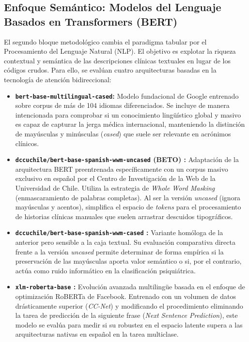 \documentclass[12pt,a4paper,onecolumn,oneside]{report}
\begin{document}
\subsection{Enfoque Semántico: Modelos del Lenguaje Basados en Transformers (BERT)}

El segundo bloque metodológico cambia el paradigma tabular por el Procesamiento del Lenguaje Natural (NLP). El objetivo es explotar la riqueza contextual y semántica de las descripciones clínicas textuales en lugar de los códigos crudos. Para ello, se evalúan cuatro arquitecturas basadas en la tecnología de atención bidireccional:

\begin{itemize}
\item \textbf{\texttt{bert-base-multilingual-cased}\cite{bert_multilingual}: } Modelo fundacional de Google entrenado sobre corpus de más de 104 idiomas diferenciados. Se incluye de manera intencionada para comprobar si un conocimiento lingüístico global y masivo es capaz de capturar la jerga médica internacional, manteniendo la distinción de mayúsculas y minúsculas (\textit{cased}) que suele ser relevante en acrónimos clínicos.

\item \textbf{\texttt{dccuchile/bert-base-spanish-wwm-uncased} (BETO) \cite{bert-base-spanish-wwm-uncased}:} Adaptación de la arquitectura BERT preentrenada específicamente con un corpus masivo exclusivo en español por el Centro de Investigación de la Web de la Universidad de Chile. Utiliza la estrategia de \textit{Whole Word Masking} (enmascaramiento de palabras completas). Al ser la versión \textit{uncased} (ignora mayúsculas y acentos), simplifica el espacio de \textit{tokens} para el procesamiento de historias clínicas manuales que suelen arrastrar descuidos tipográficos.

\item \textbf{\texttt{dccuchile/bert-base-spanish-wwm-cased} \cite{bert-base-spanish-wwm-cased}:} Variante homóloga de la anterior pero sensible a la caja textual. Su evaluación comparativa directa frente a la versión \textit{uncased} permite determinar de forma empírica si la preservación de las mayúsculas aporta valor semántico o si, por el contrario, actúa como ruido informático en la clasificación psiquiátrica.

\item \textbf{\texttt{xlm-roberta-base} \cite{xlm-roberta-base}:} Evolución avanzada multilingüe basada en el enfoque de optimización RoBERTa de Facebook. Entrenado con un volumen de datos drásticamente superior (\textit{CC-Net}) y modificando el procedimiento eliminando la tarea de predicción de la siguiente frase (\textit{Next Sentence Prediction}), este modelo se evalúa para medir si su robustez en el espacio latente supera a las arquitecturas nativas en español en la tarea multiclase.
\end{itemize}
\end{document}
